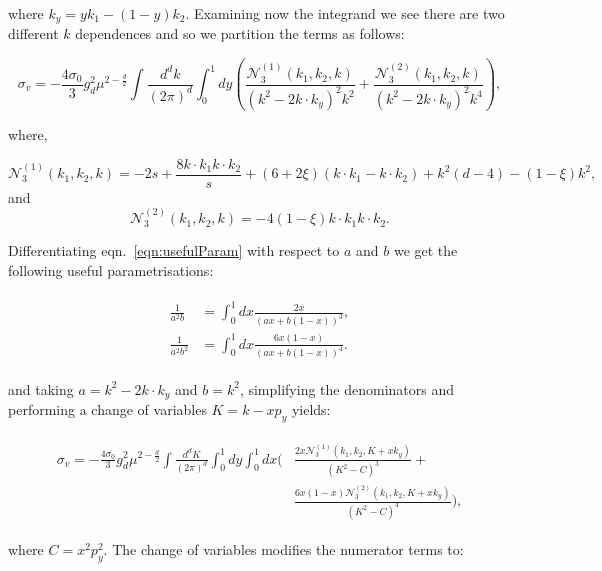 		where $k_y = yk_1 -(1-y)k_2$.  Examining now the integrand we see there are two
		different $k$ dependences and so we partition the terms as follows:

		\begin{equation}
			\sigma_v = -\frac{4\sigma_0}{3}g_d^2\mu^{2-\frac{d}{2}}\int\frac{d^{d}k}{(2\pi)^d}\int_0^1dy
			\left(\frac{\mathcal{N}^{(1)}_3(k_1, k_2, k)}{(k^2-2k\cdot k_y)^2k^2} +
			\frac{\mathcal{N}^{(2)}_3(k_1, k_2, k)}{(k^2-2k\cdot k_y)^2k^4}\right),
		\end{equation}

		where,

		\begin{equation}
			\mathcal{N}^{(1)}_3(k_1, k_2, k) = -2s + \frac{8k\cdot k_1k\cdot k_2}{s} +
			(6+2\xi)(k\cdot k_1 - k\cdot k_2) + k^2(d-4) - (1-\xi)k^2,
		\end{equation}
		and
		\begin{equation}
			\mathcal{N}^{(2)}_3(k_1, k_2, k) = - 4(1-\xi)k\cdot k_1 k\cdot k_2.
		\end{equation}

		Differentiating eqn.~\eqref{eqn:usefulParam} with respect to $a$ and $b$ we get the following useful parametrisations:

		\begin{align}
		\begin{split}
			\frac{1}{a^2b} &= \int_0^1dx\frac{2x}{(ax+b(1-x))^3},\\
			\frac{1}{a^2b^2} &= \int_0^1dx\frac{6x(1-x)}{(ax+b(1-x))^4}.
		\end{split}
		\end{align}

		and taking $a = k^2-2k\cdot k_y$ and $b = k^2$, simplifying the denominators and performing a change of variables $K=k-xp_y$ yields:

		\begin{align}
		\begin{split}
			\sigma_v = -\frac{4\sigma_0}{3}g_d^2\mu^{2-\frac{d}{2}}\int\frac{d^{d}K}{(2\pi)^d}\int_0^1dy\int_0^1dx
			\Bigg(&\frac{2x\mathcal{N}^{(1)}_3(k_1, k_2, K+xk_y)}{(K^2-C)^3} + \\&\frac{6x(1-x)
			\mathcal{N}^{(2)}_3(k_1, k_2, K+xk_y)}{(K^2-C)^4}\Bigg),
		\end{split}
		\end{align}

		where $C = x^2p_y^2$.  The change of variables modifies the numerator terms to:

